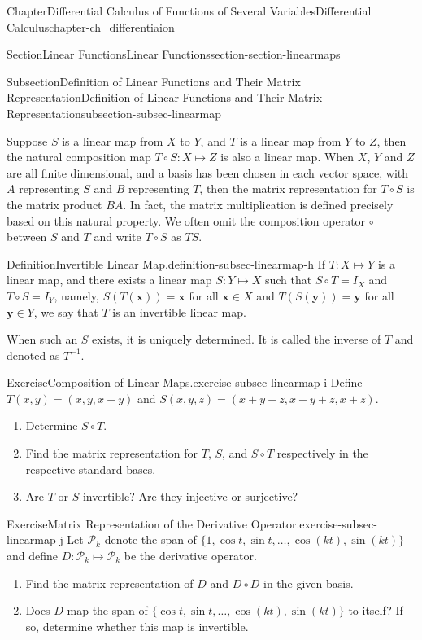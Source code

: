 \documentclass[oneside,10pt,]{book}
\numberwithin{equation}{section}
\newcommand{\bx}{\mathbf{x}}
\newcommand{\by}{\mathbf{y}}
\newcommand{\cP}{\mathcal{P}}
\begin{document}
\begin{chapterptx}{Chapter}{Differential Calculus of Functions of Several Variables}{}{Differential Calculus}{}{}{chapter-ch_differentiaion}
\begin{sectionptx}{Section}{Linear Functions}{}{Linear Functions}{}{}{section-section-linearmaps}
\begin{subsectionptx}{Subsection}{Definition of  Linear Functions and Their Matrix Representation}{}{Definition of  Linear Functions and Their Matrix Representation}{}{}{subsection-subsec-linearmap}
\par
Suppose \(S\) is a linear map from \(X\) to  \(Y\), and \(T\) is a linear map from \(Y\) to  \(Z\), then the natural composition map \(T\circ S: X\mapsto Z\) is also a linear map. When \(X\),  \(Y\) and \(Z\) are all finite dimensional, and a basis has been chosen in each vector space, with \(A\) representing \(S\) and \(B\) representing \(T\), then the matrix representation for \(T\circ S\) is the matrix product \(BA\). In fact, the matrix multiplication is defined precisely based on this natural property. We often omit the composition operator \(\circ\) between \(S\) and \(T\) and write \(T\circ S\) as \(TS\).%
\begin{definition}{Definition}{Invertible Linear Map.}{definition-subsec-linearmap-h}%
If \(T:X\mapsto Y\) is a linear map, and there exists a linear map \(S: Y\mapsto X\) such that \(S\circ T=I_{X}\) and \(T\circ S=I_{Y}\), namely, \(S(T(\bx))=\bx\) for all \(\bx\in X\) and \(T(S(\by))=\by\) for all \(\by \in Y\), we say that \(T\) is an invertible linear map.%
\par
When such an \(S\) exists, it is uniquely determined. It is called the inverse of \(T\) and denoted as \(T^{-1}\).%
\end{definition}
\begin{inlineexercise}{Exercise}{Composition of Linear Maps.}{exercise-subsec-linearmap-i}%
Define \(T(x, y)=(x, y, x+y)\) and \(S(x, y, z)=(x+y+z, x-y+z, x+z)\). %
\begin{enumerate}[label=(\alph*)]
\item{}Determine \(S\circ T\).%
\item{}Find the matrix representation for \(T\), \(S\), and \(S\circ T\) respectively in the respective standard bases.%
\item{}Are \(T\) or \(S\) invertible? Are they injective or surjective?%
\end{enumerate}
\end{inlineexercise}%
\begin{inlineexercise}{Exercise}{Matrix Representation of the Derivative Operator.}{exercise-subsec-linearmap-j}%
Let \(\cP_{k}\) denote the span of \(\{1, \cos t, \sin t, \ldots, \cos (kt), \sin (kt)\}\) and define \(D:\cP_{k}\mapsto \cP_{k}\) be the derivative operator. %
\begin{enumerate}[label=(\alph*)]
\item{}Find  the matrix representation of \(D\) and \(D\circ D\) in the given basis.%
\item{}Does \(D\) map the span of \(\{ \cos t, \sin t, \ldots, \cos (kt), \sin (kt)\}\) to itself? If so, determine whether this map is invertible.%

\end{enumerate}
\end{inlineexercise}
\end{subsectionptx}
\end{sectionptx}
\end{chapterptx}
\end{document}
